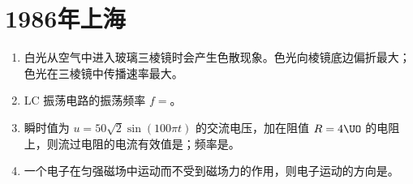 \documentclass[\gkver]{gaokaozhenti}
\begin{document}
\chapter{1986年上海}

\begin{enumerate}
\item
白光从空气中进入玻璃三棱镜时会产生色散现象。色光向棱镜底边偏折最大；色光在三棱镜中传播速率最大。



\item
LC 振荡电路的振荡频率 $f=$。



\item
瞬时值为 $u=50\sqrt{2}\sin(100\pi t)$ 的交流电压，加在阻值 $R=4\UO$ 的电阻上，则流过电阻的电流有效值是\tkanswer{$12.5\UA$}；频率是\tkanswer{$50\UHz$}。



\item
一个电子在匀强磁场中运动而不受到磁场力的作用，则电子运动的方向是。




\end{enumerate}
\end{document}
